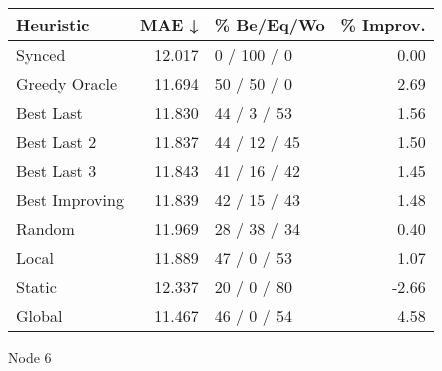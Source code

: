 \begin{tabular}{lrlr}
\toprule
\textbf{Heuristic} & \textbf{MAE ↓} & \textbf{\% Be/Eq/Wo} & \textbf{\% Improv.} \\
\midrule
            Synced &         12.017 &          0 / 100 / 0 &                0.00 \\
     Greedy Oracle &         11.694 &          50 / 50 / 0 &                2.69 \\
         Best Last &         11.830 &          44 / 3 / 53 &                1.56 \\
       Best Last 2 &         11.837 &         44 / 12 / 45 &                1.50 \\
       Best Last 3 &         11.843 &         41 / 16 / 42 &                1.45 \\
    Best Improving &         11.839 &         42 / 15 / 43 &                1.48 \\
            Random &         11.969 &         28 / 38 / 34 &                0.40 \\
             Local &         11.889 &          47 / 0 / 53 &                1.07 \\
            Static &         12.337 &          20 / 0 / 80 &               -2.66 \\
            Global &         11.467 &          46 / 0 / 54 &                4.58 \\
\bottomrule
\end{tabular}
\caption{Node 6}
\label{tab:ds_iid_lr05_le2_bs2_6}
